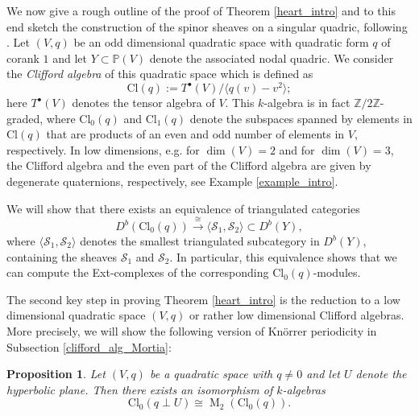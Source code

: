 \documentclass[a4paper, twoside, 11pt]{amsart}
\newtheorem{proposition}[theorem]{Proposition}
\theoremstyle{definition}
\theoremstyle{remark}
\numberwithin{equation}{theorem}
\DeclareMathOperator{\matri}{M}
\newcommand{\evencl}{\mathrm{Cl}_0}
\newcommand{\oddcl}{\mathrm{Cl}_1}
\newcommand{\cl}{\mathrm{Cl}}
\begin{document}
We now give a rough outline of the proof of Theorem \ref{heart_intro} and to this end sketch the construction of the spinor sheaves on a singular quadric, following \cite{Addington}. Let $(V,q)$ be an odd dimensional quadratic space with quadratic form $q$ of corank $1$ and let $Y \subset \mathbb{P}(V)$ denote the associated nodal quadric. We consider the \textit{Clifford algebra} of this quadratic space which is defined as
\begin{equation*}
    \cl(q) := T^{\bullet}(V)/\langle q(v) - v^2 \rangle;
\end{equation*}
here $T^{\bullet}(V)$ denotes the tensor algebra of $V$. This $k$-algebra is in fact $\mathbb{Z}/2\mathbb{Z}$-graded, where $\evencl(q)$ and $\oddcl(q)$ denote the subspaces spanned by elements in $\cl(q)$ that are products of an even and odd number of elements in $V$, respectively. In low dimensions, e.g. for $\dim(V)= 2$ and for $\dim(V) =3$, the Clifford algebra and the even part of the Clifford algebra are given by degenerate quaternions, respectively, see Example \ref{example_intro}. 

We will show that there exists an equivalence of triangulated categories
\begin{equation}
     D^b(\evencl(q)) \overset{\cong}{\longrightarrow} \langle \mathcal{S}_1, \mathcal{S}_2 \rangle \subset D^b(Y),
\end{equation}
where $\langle \mathcal{S}_1, \mathcal{S}_2 \rangle$ denotes the smallest triangulated subcategory in $D^b(Y)$, containing the sheaves $\mathcal{S}_1$ and $\mathcal{S}_2$. In particular, this equivalence shows that we can compute the Ext-complexes of the corresponding $\evencl(q)$-modules. 

The second key step in proving Theorem \ref{heart_intro} is the reduction to a low dimensional quadratic space $(V,q)$ or rather low dimensional Clifford algebras. More precisely, we will show the following version of Knörrer periodicity in Subsection \ref{clifford_alg_Mortia}: 
\begin{proposition}
    Let $(V,q)$ be a quadratic space with $q\neq 0$ and let $U$ denote the hyperbolic plane. Then there exists an isomorphism of $k$-algebras 
    \begin{equation*}
        \evencl(q \perp U) \cong \matri_2(\evencl(q)).
    \end{equation*}
\end{proposition}
\end{document}
